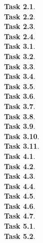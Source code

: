\documentclass[11pt]{article}
\newcommand{\task}[1]{\clearpage\textbf{Task #1}. \\[0.5em]}
\newcommand{\eeq}{\cong}
\newcommand{\code}[2][]{{\sloppy
\ifmmode
    \text{\lstinline[language=sml,style=15150code,#1]`#2`}
\else
    {\lstinline[language=sml,style=15150code,#1]`#2`}%
\fi}}
\newcommand{\codefile}[2][]{}
\begin{document}





\task{2.1}

\task{2.2}

\task{2.3}

\task{2.4}

\task{3.1}

\task{3.2}

\task{3.3}

\task{3.4}

\task{3.5}

\task{3.6}

\task{3.7}

\task{3.8}

\task{3.9}

\task{3.10}

\task{3.11}

\task{4.1}

\task{4.2}

\task{4.3}

\task{4.4}

\task{4.5}

\task{4.6}

\task{4.7}

\task{5.1}

\task{5.2}
\end{document}
